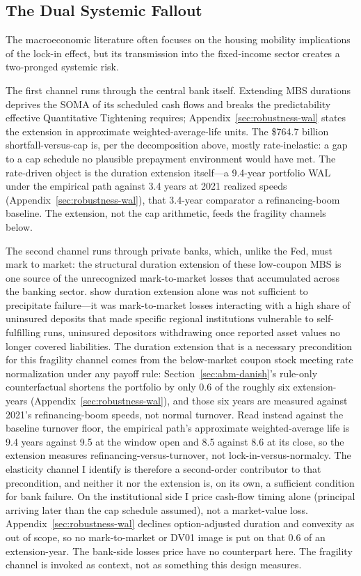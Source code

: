 \documentclass[12pt]{article}
\begin{document}
\subsection{The Dual Systemic Fallout}\label{sec:discussion-fallout}

The macroeconomic literature often focuses on the housing mobility implications of the lock-in effect, but its transmission into the fixed-income sector creates a two-pronged systemic risk.

The first channel runs through the central bank itself. Extending MBS durations deprives the SOMA of its scheduled cash flows and breaks the predictability effective Quantitative Tightening requires; Appendix~\ref{sec:robustness-wal} states the extension in approximate weighted-average-life units. The \$764.7 billion shortfall-versus-cap is, per the decomposition above, mostly rate-inelastic: a gap to a cap schedule no plausible prepayment environment would have met. The rate-driven object is the duration extension itself---a 9.4-year portfolio WAL under the empirical path against 3.4 years at 2021 realized speeds (Appendix~\ref{sec:robustness-wal}), that 3.4-year comparator a refinancing-boom baseline. The extension, not the cap arithmetic, feeds the fragility channels below.

The second channel runs through private banks, which, unlike the Fed, must mark to market: the structural duration extension of these low-coupon MBS is one source of the unrecognized mark-to-market losses that accumulated across the banking sector. \citet{jiang2023} show duration extension alone was not sufficient to precipitate failure---it was mark-to-market losses interacting with a high share of uninsured deposits that made specific regional institutions vulnerable to self-fulfilling runs, uninsured depositors withdrawing once reported asset values no longer covered liabilities. The duration extension that is a necessary precondition for this fragility channel comes from the below-market coupon stock meeting rate normalization under any payoff rule: Section~\ref{sec:abm-danish}'s rule-only counterfactual shortens the portfolio by only 0.6 of the roughly six extension-years (Appendix~\ref{sec:robustness-wal}), and those six years are measured against 2021's refinancing-boom speeds, not normal turnover. Read instead against the baseline turnover floor, the empirical path's approximate weighted-average life is 9.4 years against 9.5 at the window open and 8.5 against 8.6 at its close, so the extension measures refinancing-versus-turnover, not lock-in-versus-normalcy. The elasticity channel I identify is therefore a second-order contributor to that precondition, and neither it nor the extension is, on its own, a sufficient condition for bank failure. On the institutional side I price cash-flow timing alone (principal arriving later than the cap schedule assumed), not a market-value loss. Appendix~\ref{sec:robustness-wal} declines option-adjusted duration and convexity as out of scope, so no mark-to-market or DV01 image is put on that 0.6 of an extension-year. The bank-side losses \citet{jiang2023} price have no counterpart here. The fragility channel is invoked as context, not as something this design measures.
\end{document}
